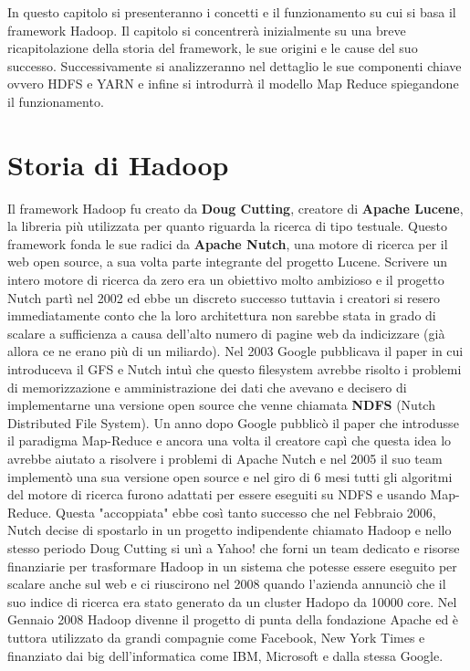In questo capitolo si presenteranno i concetti e il funzionamento su cui si basa il framework Hadoop. Il capitolo si concentrerà inizialmente su una breve ricapitolazione della storia del framework, le sue origini e le cause del suo successo. Successivamente si analizzeranno nel dettaglio le sue componenti chiave ovvero HDFS e YARN e infine si introdurrà il modello Map Reduce spiegandone il funzionamento.
\section{Storia di Hadoop}
Il framework Hadoop fu creato da \textbf{Doug Cutting}, creatore di \textbf{Apache Lucene}, la libreria più utilizzata per quanto riguarda la ricerca di tipo testuale. Questo framework fonda le sue radici da \textbf{Apache Nutch}, una motore di ricerca per il web open source, a sua volta parte integrante del progetto Lucene. Scrivere un intero motore di ricerca da zero era un obiettivo molto ambizioso e il progetto Nutch partì nel 2002 ed ebbe un discreto successo tuttavia i creatori si resero immediatamente conto che la loro architettura non sarebbe stata in grado di scalare a sufficienza a causa dell'alto numero di pagine web da indicizzare (già allora ce ne erano più di un miliardo). Nel 2003 Google pubblicava il paper in cui introduceva il GFS e Nutch intuì che questo filesystem avrebbe risolto i problemi di memorizzazione e amministrazione dei dati che avevano e decisero di implementarne una versione open source che venne chiamata \textbf{NDFS} (Nutch Distributed File System). Un anno dopo Google pubblicò il paper che introdusse il paradigma Map-Reduce e ancora una volta il creatore capì che questa idea lo avrebbe aiutato a risolvere i problemi di Apache Nutch e nel 2005 il suo team implementò una sua versione open source e nel giro di 6 mesi tutti gli algoritmi del motore di ricerca furono adattati per essere eseguiti su NDFS e usando Map-Reduce. Questa "accoppiata" ebbe così tanto successo che nel Febbraio 2006, Nutch decise di spostarlo in un progetto indipendente chiamato Hadoop e nello stesso periodo Doug Cutting si unì a Yahoo! che forni un team dedicato e risorse finanziarie per trasformare Hadoop in un sistema che potesse essere eseguito per scalare anche sul web e ci riuscirono nel 2008 quando l'azienda annunciò che il suo indice di ricerca era stato generato da un cluster Hadopo da 10000 core. Nel Gennaio 2008 Hadoop divenne il progetto di punta della fondazione Apache ed è tuttora utilizzato da grandi compagnie come Facebook, New York Times e finanziato dai big dell'informatica come IBM, Microsoft e dalla stessa Google.
